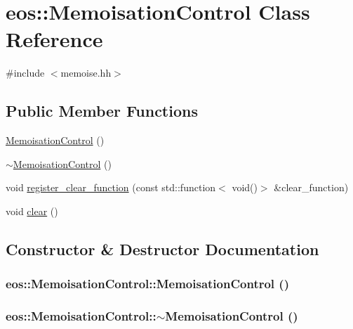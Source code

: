 \hypertarget{classeos_1_1MemoisationControl}{
\section{eos::MemoisationControl Class Reference}
\label{classeos_1_1MemoisationControl}
}


{\ttfamily \#include $<$memoise.hh$>$}\subsection*{Public Member Functions}
\begin{DoxyCompactItemize}
\item 
\hyperlink{classeos_1_1MemoisationControl_a78dbad6e5ef8bb969dabcdc9b30a5032}{MemoisationControl} ()
\item 
\hyperlink{classeos_1_1MemoisationControl_a71e3b46d0f835cc3b73344b9e4dea84c}{$\sim$MemoisationControl} ()
\item 
void \hyperlink{classeos_1_1MemoisationControl_a32eabb533067c5313d5154930f6fbb2f}{register\_\-clear\_\-function} (const std::function$<$ void()$>$ \&clear\_\-function)
\item 
void \hyperlink{classeos_1_1MemoisationControl_a36c8f1afbaed242d480619a847f51b7d}{clear} ()
\end{DoxyCompactItemize}


\subsection{Constructor \& Destructor Documentation}
\hypertarget{classeos_1_1MemoisationControl_a78dbad6e5ef8bb969dabcdc9b30a5032}{
\subsubsection[{MemoisationControl}]{\setlength{\rightskip}{0pt plus 5cm}eos::MemoisationControl::MemoisationControl ()}}
\label{classeos_1_1MemoisationControl_a78dbad6e5ef8bb969dabcdc9b30a5032}
\hypertarget{classeos_1_1MemoisationControl_a71e3b46d0f835cc3b73344b9e4dea84c}{
\subsubsection[{$\sim$MemoisationControl}]{\setlength{\rightskip}{0pt plus 5cm}eos::MemoisationControl::$\sim$MemoisationControl ()}}
\label{classeos_1_1MemoisationControl_a71e3b46d0f835cc3b73344b9e4dea84c}


